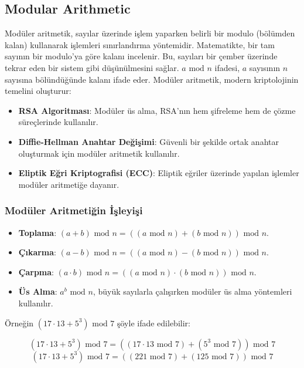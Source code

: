 \subsection{Modular Arithmetic}

Modüler aritmetik, sayılar üzerinde işlem yaparken belirli bir modulo (bölümden kalan) kullanarak işlemleri sınırlandırma yöntemidir. Matematikte, bir tam sayının bir modulo’ya göre kalanı incelenir. Bu, sayıları bir çember üzerinde tekrar eden bir sistem gibi düşünülmesini sağlar. $a \text{ mod } n$ ifadesi, $a$ sayısının $n$ sayısına bölündüğünde kalanı ifade eder. Modüler aritmetik, modern kriptolojinin temelini oluşturur:

\begin{itemize}
    \item \textbf{RSA Algoritması}: Modüler üs alma, RSA'nın hem şifreleme hem de çözme süreçlerinde kullanılır.
    \item \textbf{Diffie-Hellman Anahtar Değişimi}: Güvenli bir şekilde ortak anahtar oluşturmak için modüler aritmetik kullanılır.
    \item \textbf{Eliptik Eğri Kriptografisi (ECC)}: Eliptik eğriler üzerinde yapılan işlemler modüler aritmetiğe dayanır.
\end{itemize}

\subsubsection{Modüler Aritmetiğin İşleyişi}

\begin{itemize}
    \item \textbf{Toplama}: $(a + b) \text{ mod } n = ((a \text{ mod } n) + (b \text{ mod } n)) \text{ mod } n$.
    \item \textbf{Çıkarma}: $(a - b) \text{ mod } n = ((a \text{ mod } n) - (b \text{ mod } n)) \text{ mod } n$.
    \item \textbf{Çarpma}: $(a \cdot b) \text{ mod } n = ((a \text{ mod } n) \cdot (b \text{ mod } n)) \text{ mod } n$.
    \item \textbf{Üs Alma}: $a^b \text{ mod } n$, büyük sayılarla çalışırken modüler üs alma yöntemleri kullanılır.
\end{itemize}

Örneğin $(17 \cdot 13 + 5^3) \text{ mod } 7$ şöyle ifade edilebilir:

\[ (17 \cdot 13 + 5^3) \text{ mod } 7 = ((17 \cdot 13 \text{ mod } 7) + (5^3 \text{ mod } 7)) \text{ mod } 7 \]
\[ (17 \cdot 13 + 5^3) \text{ mod } 7 = ((221 \text{ mod } 7) + (125 \text{ mod } 7)) \text{ mod } 7 \]


